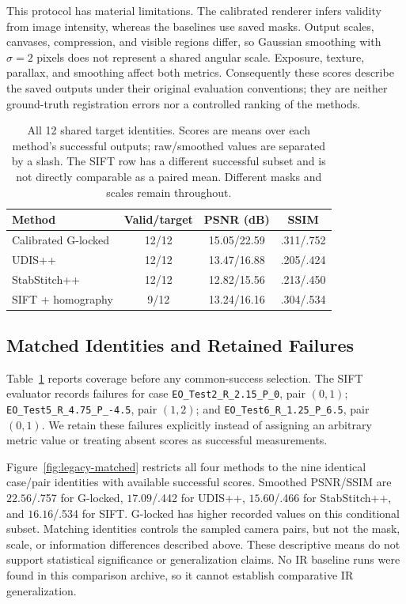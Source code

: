 This protocol has material limitations. The calibrated renderer infers validity
from image intensity, whereas the baselines use saved masks. Output scales,
canvases, compression, and visible regions differ, so Gaussian smoothing with
$\sigma=2$ pixels does not represent a shared angular scale. Exposure, texture, parallax,
and smoothing affect both metrics. Consequently these scores describe the saved
outputs under their original evaluation conventions; they are neither
ground-truth registration errors nor a controlled ranking of the methods.

\begin{table}[t]
\centering
\caption{All 12 shared target identities. Scores are means over each method's
successful outputs; raw/smoothed values are separated by a slash. The SIFT row
has a different successful subset and is not directly comparable as a paired
mean. Different masks and scales remain throughout.}
\label{tab:legacy-targets}
\small
\setlength{\tabcolsep}{3pt}
\begin{tabular}{lccc}
\toprule
Method & Valid/target & PSNR (dB) & SSIM \\
\midrule
Calibrated G-locked & 12/12 & 15.05/22.59 & .311/.752 \\
UDIS++ & 12/12 & 13.47/16.88 & .205/.424 \\
StabStitch++ & 12/12 & 12.82/15.56 & .213/.450 \\
SIFT + homography & 9/12 & 13.24/16.16 & .304/.534 \\
\bottomrule
\end{tabular}
\end{table}

\subsection{Matched Identities and Retained Failures}
Table~\ref{tab:legacy-targets} reports coverage before any common-success
selection. The SIFT evaluator records failures for case
\texttt{EO\_Test2\_R\_2.15\_P\_0}, pair $(0,1)$;
\texttt{EO\_Test5\_R\_4.75\_P\_-4.5}, pair $(1,2)$; and
\texttt{EO\_Test6\_R\_1.25\_P\_6.5}, pair $(0,1)$.
We retain these failures explicitly instead of assigning an arbitrary metric
value or treating absent scores as successful measurements.

Figure~\ref{fig:legacy-matched} restricts all four methods to the nine identical
case/pair identities with available successful scores. Smoothed PSNR/SSIM are
$22.56$/.757 for G-locked, $17.09$/.442 for UDIS++, $15.60$/.466 for
StabStitch++, and $16.16$/.534 for SIFT. G-locked has higher recorded values on
this conditional subset. Matching identities controls the sampled camera pairs, but not the mask,
scale, or information differences described
above. These descriptive means do not support statistical significance or
generalization claims. No IR baseline runs were found in this comparison
archive, so it cannot establish comparative IR generalization.


